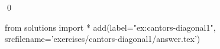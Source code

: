 
\begin{ex} 
  \label{ex:cantors-diagonal1}
  
  \qed
\end{ex} 
\begin{python0}
from solutions import *
add(label="ex:cantors-diagonal1",
    srcfilename='exercises/cantors-diagonal1/answer.tex') 
\end{python0}
